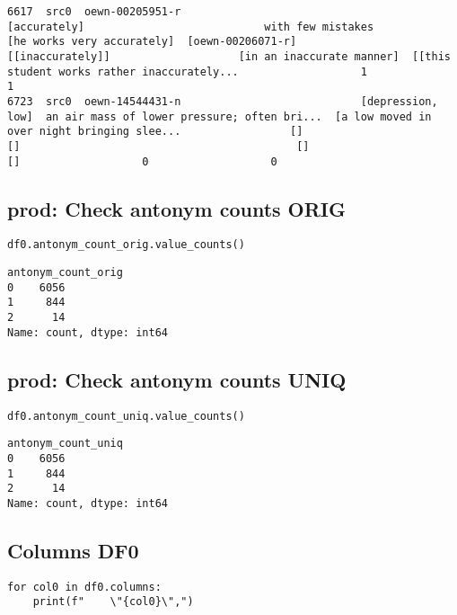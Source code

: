 \documentclass[a4paper,10pt,onecolumn,oneside,openright]{article}
\begin{document}
\begin{verbatim}
6617  src0  oewn-00205951-r                                 [accurately]                            with few mistakes                   [he works very accurately]  [oewn-00206071-r]                             [[inaccurately]]                    [in an inaccurate manner]  [[this student works rather inaccurately...                   1                   1
6723  src0  oewn-14544431-n                            [depression, low]  an air mass of lower pressure; often bri...  [a low moved in over night bringing slee...                 []                                           []                                           []                                           []                   0                   0
\end{verbatim}
\subsection{prod: Check antonym counts ORIG}
\label{sec:orgd75b8a3}
\begin{verbatim}
df0.antonym_count_orig.value_counts()
\end{verbatim}

\begin{verbatim}
antonym_count_orig
0    6056
1     844
2      14
Name: count, dtype: int64
\end{verbatim}

\subsection{prod: Check antonym counts UNIQ}
\label{sec:orgceff40e}
\begin{verbatim}
df0.antonym_count_uniq.value_counts()
\end{verbatim}

\begin{verbatim}
antonym_count_uniq
0    6056
1     844
2      14
Name: count, dtype: int64
\end{verbatim}

\subsection{Columns DF0}
\label{sec:orgfe8d804}
\begin{verbatim}
for col0 in df0.columns:
    print(f"    \"{col0}\",")
\end{verbatim}
\end{document}
